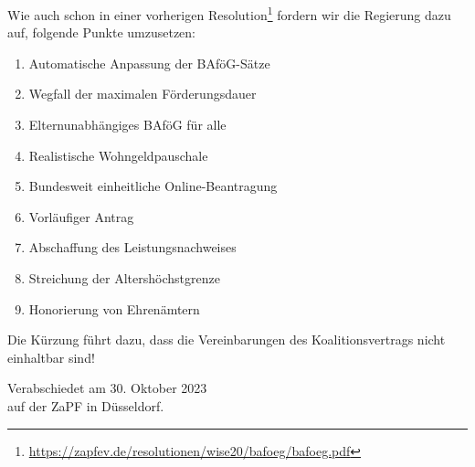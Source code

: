 \documentclass[DIV=calc]{scrartcl}
\begin{document}
Wie auch schon in einer vorherigen Resolution\footnote{\url{https://zapfev.de/resolutionen/wise20/bafoeg/bafoeg.pdf}} fordern wir die Regierung dazu auf, folgende Punkte umzusetzen:
\begin{enumerate}
    \item Automatische Anpassung der BAföG-Sätze
    \item Wegfall der maximalen Förderungsdauer
    \item Elternunabhängiges BAföG für alle
    \item Realistische Wohngeldpauschale
    \item Bundesweit einheitliche Online-Beantragung
    \item Vorläufiger Antrag
    \item Abschaffung des Leistungsnachweises
    \item Streichung der Altershöchstgrenze
    \item Honorierung von Ehrenämtern
\end{enumerate}

Die Kürzung führt dazu, dass die Vereinbarungen des Koalitionsvertrags nicht einhaltbar sind!


%
\vfill
\begin{flushright}
	Verabschiedet am 30. Oktober 2023 \\
	auf der ZaPF in Düsseldorf.
\end{flushright}
\end{document}
